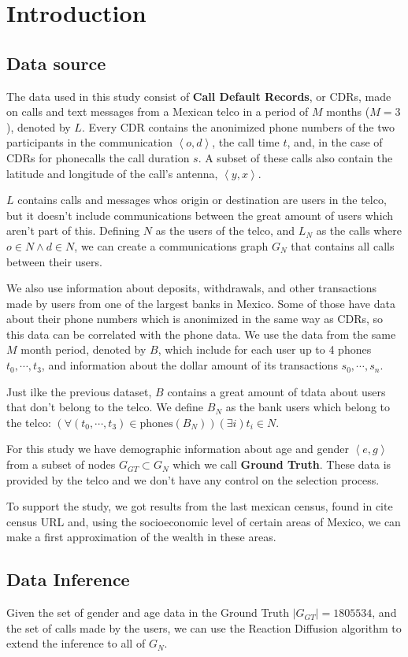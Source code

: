 \section{Introduction}

\subsection{Data source}


The data used in this study consist of \textbf{Call Default Records}, or CDRs, made on calls and text messages from a Mexican telco in a period of \( M \) months (\( M = 3 \)), denoted by \( L \). Every CDR contains the anonimized phone numbers of the two participants in the communication \(\left<o, d\right>\), the call time \( t \), and, in the case of CDRs for phonecalls the call duration \( s \). A subset of these calls also contain the latitude and longitude of the call's antenna, \( \left<y, x\right> \).

\( L \) contains calls and messages whos origin or destination are users in the telco, but it doesn't include communications between the great amount of users which aren't part of this. Defining \( N \) as the users of the telco, and \( L_N \) as the calls where \( o \in N \wedge d \in N \), we can create a communications graph \( G_N \) that contains all calls between their users.

We also use information about deposits, withdrawals, and other transactions made by users from one of the largest banks in Mexico. Some of those have data about their phone numbers which is anonimized in the same way as CDRs, so this data can be correlated with the phone data. We use the data from the same \( M \) month period, denoted by \( B \), which include for each user up to 4 phones \( t_0, \cdots, t_3 \), and information about the dollar amount of its transactions \( s_0, \cdots, s_n \).

Just ilke the previous dataset, \( B \) contains a great amount of tdata about users that don't belong to the telco. We define \( B_N \) as the bank users which belong to the telco: \( \left( \forall \left( t_0, \cdots, t_3 \right) \in \text{phones}\left( B_N \right) \right) \left( \exists i \right) t_i \in N \).

For this study we have demographic information about age and gender \( \left< e, g \right> \) from a subset of nodes \( G_{GT} \subset G_N \) which we call \textbf{Ground Truth}. These data is provided by the telco and we don't have any control on the selection process.

To support the study, we got results from the last mexican census, found in {cite census URL} and, using the socioeconomic level of certain areas of Mexico, we can make a first approximation of the wealth in these areas.

\subsection{Data Inference}

Given the set of gender and age data in the Ground Truth \( \left| G_{GT} \right| = 1805534 \), and the set of calls made by the users, we can use the Reaction Diffusion algorithm \cite{brea2014} to extend the inference to all of \( G_N \).